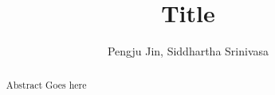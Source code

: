 \documentclass[letterpaper,conference,10pt]{ieeetran}
\begin{document}
\title{\vspace{0.20in}\LARGE Title}

\author{Pengju Jin, Siddhartha Srinivasa}
\maketitle 	

\begin{abstract}
Abstract Goes here
\end{abstract}

\IEEEpeerreviewmaketitle













\footnotesize{


}
\end{document}
